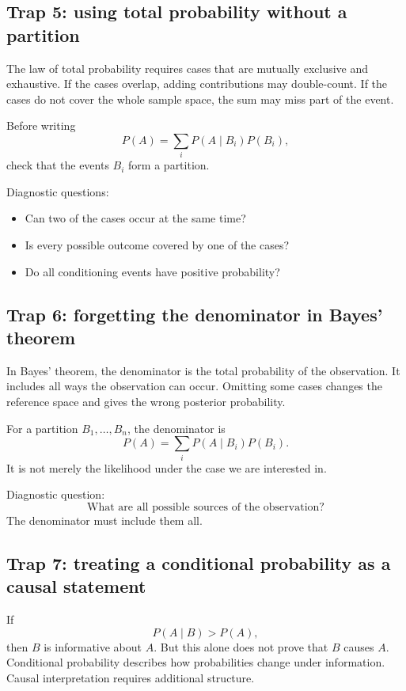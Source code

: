 \subsection*{Trap 5: using total probability without a partition}

The law of total probability requires cases that are mutually exclusive and
exhaustive. If the cases overlap, adding contributions may double-count. If the
cases do not cover the whole sample space, the sum may miss part of the event.

Before writing
\[
P(A)=\sum_i P(A\mid B_i)P(B_i),
\]
check that the events \(B_i\) form a partition.

Diagnostic questions:
\begin{itemize}
    \item Can two of the cases occur at the same time?
    \item Is every possible outcome covered by one of the cases?
    \item Do all conditioning events have positive probability?
\end{itemize}

\subsection*{Trap 6: forgetting the denominator in Bayes' theorem}

In Bayes' theorem, the denominator is the total probability of the observation.
It includes all ways the observation can occur. Omitting some cases changes the
reference space and gives the wrong posterior probability.

For a partition \(B_1,
\ldots,B_n\), the denominator is
\[
P(A)=\sum_i P(A\mid B_i)P(B_i).
\]
It is not merely the likelihood under the case we are interested in.

Diagnostic question:
\[
\text{What are all possible sources of the observation?}
\]
The denominator must include them all.

\subsection*{Trap 7: treating a conditional probability as a causal statement}

If
\[
P(A\mid B)>P(A),
\]
then \(B\) is informative about \(A\). But this alone does not prove that \(B\)
causes \(A\). Conditional probability describes how probabilities change under
information. Causal interpretation requires additional structure.

